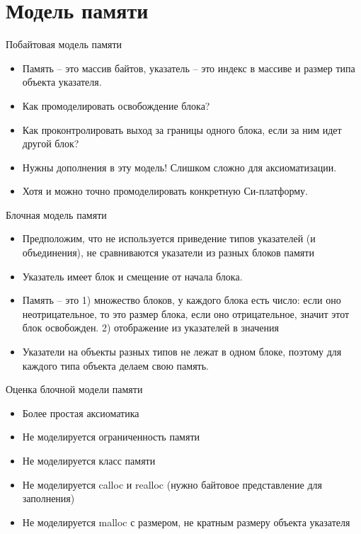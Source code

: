 \documentclass[hyperref={unicode=true}]{beamer}
\begin{document}
    \section{Модель памяти}

\iffalse
    \begin{frame}{Побайтовая модель памяти}
    \begin{itemize}
    \item Память -- это массив байтов, указатель --
    это индекс в массиве и размер типа объекта указателя.
    \item Как промоделировать освобождение блока?
    \item
    Как проконтролировать выход за границы одного блока,
    если за ним идет другой блок?
    \item Нужны дополнения
    в эту модель! Слишком сложно для аксиоматизации.
    \item Хотя и можно точно промоделировать конкретную
    Си-платформу.
    \end{itemize}
    \end{frame}

    \begin{frame}{Блочная модель памяти}
    \begin{itemize}
    \item Предположим, что не используется приведение
    типов указателей (и объединения), не сравниваются
    указатели из разных блоков памяти
    \item
    Указатель имеет блок и смещение от начала блока.
    \item
    Память -- это 1) множество блоков, у каждого блока есть
    число: если оно неотрицательное, то это размер блока,
    если оно отрицательное, значит этот блок освобожден.
    2) отображение из указателей в значения
    \item
    Указатели на объекты разных типов не лежат в одном блоке,
    поэтому для каждого типа объекта делаем свою память.
    \end{itemize}
    \end{frame}

    \begin{frame}{Оценка блочной модели памяти}
    \begin{itemize}
    \item Более простая аксиоматика
    \item Не моделируется ограниченность памяти
    \item Не моделируется класс памяти
    \item Не моделируется calloc и realloc
    (нужно байтовое представление для заполнения)
    \item Не моделируется malloc с
    размером, не кратным размеру объекта указателя
    \end{itemize}
    \end{frame}
\end{document}
